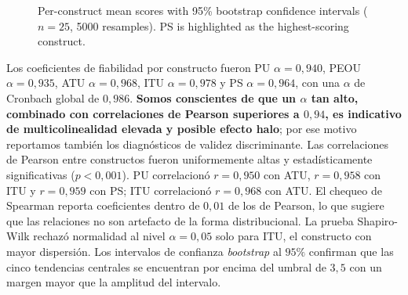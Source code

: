 \documentclass[a4paper,fleqn]{cas-sc}
\begin{document}
	\begin{figure}[t]
		\centering
		\caption{Per-construct mean scores with 95\% bootstrap confidence intervals ($n=25$, 5000 resamples). PS is highlighted as the highest-scoring construct.}
		\label{fig:tam}
	\end{figure}
	
	Los coeficientes de fiabilidad por constructo fueron PU $\alpha=0{,}940$, PEOU $\alpha=0{,}935$, ATU $\alpha=0{,}968$, ITU $\alpha=0{,}978$ y PS $\alpha=0{,}964$, con una $\alpha$ de Cronbach global de $0{,}986$. \textbf{Somos conscientes de que un $\alpha$ tan alto, combinado con correlaciones de Pearson superiores a $0{,}94$, es indicativo de multicolinealidad elevada y posible efecto halo}; por ese motivo reportamos tambi\'en los diagn\'osticos de validez discriminante. Las correlaciones de Pearson entre constructos fueron uniformemente altas y estad\'isticamente significativas ($p<0{,}001$). PU correlacion\'o $r=0{,}950$ con ATU, $r=0{,}958$ con ITU y $r=0{,}959$ con PS; ITU correlacion\'o $r=0{,}968$ con ATU. El chequeo de Spearman reporta coeficientes dentro de $0{,}01$ de los de Pearson, lo que sugiere que las relaciones no son artefacto de la forma distribucional. La prueba Shapiro-Wilk rechaz\'o normalidad al nivel $\alpha=0{,}05$ solo para ITU, el constructo con mayor dispersi\'on. Los intervalos de confianza \emph{bootstrap} al $95\%$ confirman que las cinco tendencias centrales se encuentran por encima del umbral de $3{,}5$ con un margen mayor que la amplitud del intervalo.
	
\end{document}
